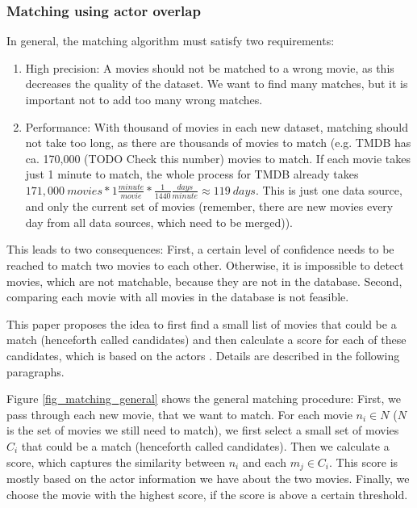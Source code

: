\subsubsection{Matching using actor overlap}
In general, the matching algorithm must satisfy two requirements:
\begin{enumerate}
	\item{High precision:} A movies should not be matched to a wrong movie, as this decreases the quality of the dataset. We want to find many matches, but it is important not to add too many wrong matches.
	\item{Performance:} With thousand of movies in each new dataset, matching should not take too long, as there are thousands of movies to match (e.g. TMDB has ca. 170,000 (TODO Check this number) movies to match.
	If each movie takes just 1 minute to match, the whole process for TMDB already takes $171,000~movies * 1 \frac{minute}{movie} * \frac{1}{1440} \frac{days}{minute} \approx 119~days$.
	This is just one data source, and only the current set of movies (remember, there are new movies every day from all data sources, which need to be merged)).
\end{enumerate}

This leads to two consequences: First, a certain level of confidence needs to be reached to match two movies to each other. Otherwise, it is impossible to detect movies, which are not matchable, because they are not in the database.
Second, comparing each movie with all movies in the database is not feasible.

This paper proposes the idea to first find a small list of movies that could be a match (henceforth called candidates) and then calculate a score for each of these candidates, which is based on the actors . Details are described in the following paragraphs.

Figure \ref{fig_matching_general} shows the general matching procedure:
First, we pass through each new movie, that we want to match.
For each movie $n_i \in N$ ($N$ is the set of movies we still need to match), we first select a small set of movies $C_{i}$ that could be a match (henceforth called candidates).
Then we calculate a score, which captures the similarity between $n_i$ and each $m_j \in C_i$.
This score is mostly based on the actor information we have about the two movies.
Finally, we choose the movie with the highest score, if the score is above a certain threshold.

